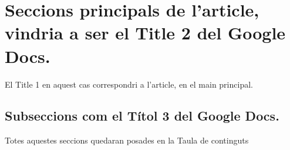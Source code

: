 \section{Seccions principals de l'article, vindria a ser el Title 2 del Google Docs.}
El Title 1 en aquest cas correspondri a l'article,  en el main principal.
\subsection{Subseccions com el Títol 3 del Google Docs.}

\newpage %

Totes aquestes seccions quedaran posades en la Taula de continguts \cite{autor} %

